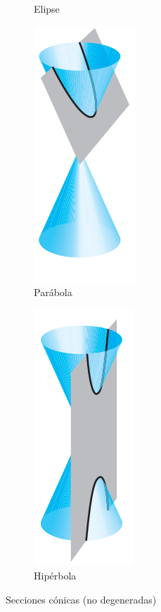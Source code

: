 \begin{frame}
\begin{figure}
\begin{subfigure}[b]{0.22\textwidth}
			\caption{Elipse}
		\end{subfigure}
		\hspace{2mm}
		\begin{subfigure}[b]{0.22\textwidth}
			\centering
			\includegraphics[height=\textwidth]{imagenes/conica3}
			\caption{Parábola}
		\end{subfigure}
		\hspace{2mm}
		\begin{subfigure}[b]{0.22\textwidth}
			\centering
			\includegraphics[height=\textwidth]{imagenes/conica4}
			\caption{Hipérbola}
		\end{subfigure}
		\vspace{3mm}
		\caption{Secciones cónicas (no degeneradas)}
	\end{figure}


\end{frame}
